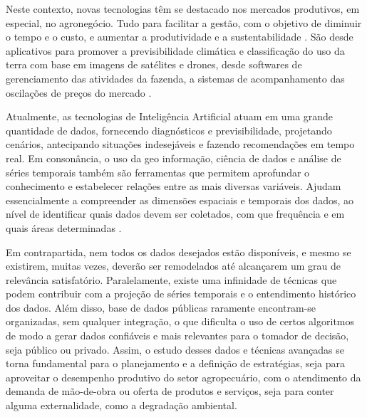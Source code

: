 Neste contexto, novas tecnologias têm se destacado nos mercados produtivos, em especial, no agronegócio. Tudo para facilitar a gestão, com o objetivo de diminuir o tempo e o custo, e aumentar a produtividade e a sustentabilidade \cite{renzcherchen2021desenvolvimento}. São desde aplicativos para promover a previsibilidade climática e classificação do uso da terra com base em imagens de satélites e drones, desde softwares de gerenciamento das atividades da fazenda, a sistemas de acompanhamento das oscilações de preços do mercado \cite{gardon2020brazil}.

Atualmente, as tecnologias de Inteligência Artificial atuam em uma grande quantidade de dados, fornecendo diagnósticos e previsibilidade, projetando cenários, antecipando situações indesejáveis e fazendo recomendações em tempo real. Em consonância, o uso da geo informação, ciência de dados e análise de séries temporais também são ferramentas que permitem aprofundar o conhecimento e estabelecer relações entre as mais diversas variáveis. Ajudam essencialmente a compreender as dimensões espaciais e temporais dos dados, ao nível de identificar quais dados devem ser coletados, com que frequência e em quais áreas determinadas \cite{de2020mineraccao}.

Em contrapartida, nem todos os dados desejados estão disponíveis, e mesmo se existirem, muitas vezes, deverão ser remodelados até alcançarem um grau de relevância satisfatório. Paralelamente, existe uma infinidade de técnicas que podem contribuir com a projeção de séries temporais e o entendimento histórico dos dados. Além disso, base de dados públicas raramente encontram-se organizadas, sem qualquer integração, o que dificulta o uso de certos algoritmos de modo a gerar dados confiáveis e mais relevantes para o tomador de decisão, seja público ou privado. Assim, o estudo desses dados e técnicas avançadas se torna fundamental para o planejamento e a definição de estratégias, seja para aproveitar o desempenho produtivo do setor agropecuário, com o atendimento da demanda de mão-de-obra ou oferta de produtos e serviços, seja para conter alguma
externalidade, como a degradação ambiental.